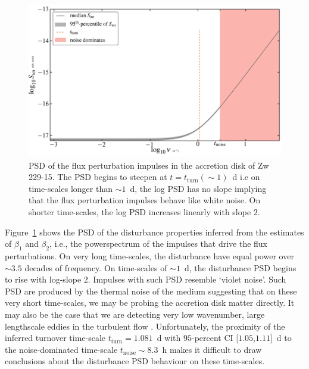 \documentclass[a4paper,fleqn,usenatbib]{mnras}
\begin{document}
\begin{figure}
    \includegraphics[width=\columnwidth]{images/Zw229-15_distPSD.jpg}
    \caption{PSD of the flux perturbation impulses in the accretion disk of Zw 229-15. The PSD begins to steepen at $t = t_{\mathrm{turn}} (\sim 1)$~d i.e on time-scales longer than $\sim 1$~d, the log PSD has no slope implying that the flux perturbation impulses behave like white noise. On shorter time-scales, the log PSD increases linearly with slope $2$.}
    \label{fig:Zw229-15_distPSD}
\end{figure}

Figure~\ref{fig:Zw229-15_distPSD} shows the PSD of the disturbance properties inferred from the estimates of $\beta_{1}$ and $\beta_{2}$, i.e., the powerspectrum of the impulses that drive the flux perturbations. On very long time-scales, the disturbance have equal power over $\sim 3.5$ decades of frequency. On time-scales of $\sim 1$~d, the disturbance PSD begins to rise with log-slope $2$. Impulses with such PSD resemble `violet noise'. Such PSD are produced by the thermal noise of the medium \citep{Mellen52} suggesting that on these very short time-scales, we may be probing the accretion disk matter directly. It may also be the case that we are detecting very low wavenumber, large lengthscale eddies in the turbulent flow \citep{EddySim15}. Unfortunately, the proximity of the inferred turnover time-scale $t_{\mathrm{turn}} = 1.081$~d with $95$-percent CI [$1.05$,$1.11$]~d to the noise-dominated time-scale $t_{\mathrm{noise}} \sim 8.3$~h makes it difficult to draw conclusions about the disturbance PSD behaviour on these time-scales.
\end{document}
